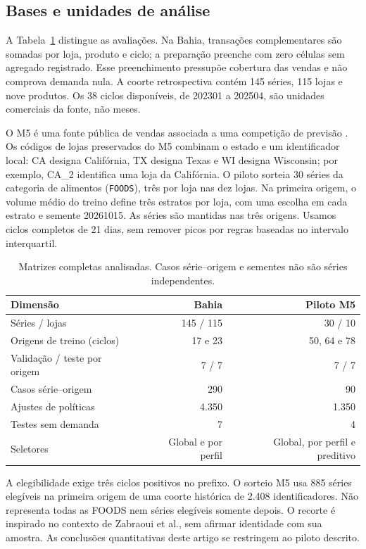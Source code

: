 \documentclass[preprint,12pt]{elsarticle}
\begin{document}
\subsection{Bases e unidades de análise}
A Tabela~\ref{tab:datasets} distingue as avaliações. Na Bahia, transações complementares são somadas por loja, produto e ciclo; a preparação preenche com zero células sem agregado registrado. Esse preenchimento pressupõe cobertura das vendas e não comprova demanda nula. A coorte retrospectiva contém 145 séries, 115 lojas e nove produtos. Os 38 ciclos disponíveis, de 202301 a 202504, são unidades comerciais da fonte, não meses.

O M5 é uma fonte pública de vendas associada a uma competição de previsão \cite{Makridakis2022M5Accuracy}. Os códigos de lojas preservados do M5 combinam o estado e um identificador local: CA designa Califórnia, TX designa Texas e WI designa Wisconsin; por exemplo, CA\_2 identifica uma loja da Califórnia. O piloto sorteia 30 séries da categoria de alimentos (\texttt{FOODS}), três por loja nas dez lojas. Na primeira origem, o volume médio do treino define três estratos por loja, com uma escolha em cada estrato e semente 20261015. As séries são mantidas nas três origens. Usamos ciclos completos de 21 dias, sem remover picos por regras baseadas no intervalo interquartil.

\begin{table}[htbp]\centering\small
\caption{Matrizes completas analisadas. Casos série--origem e sementes não são séries independentes.}\label{tab:datasets}
\begin{tabular}{@{}lrr@{}}\toprule
Dimensão & Bahia & Piloto M5\\\midrule
Séries / lojas & 145 / 115 & 30 / 10\\
Origens de treino (ciclos) & 17 e 23 & 50, 64 e 78\\
Validação / teste por origem & 7 / 7 & 7 / 7\\
Casos série--origem & 290 & 90\\
Ajustes de políticas & 4.350 & 1.350\\
Testes sem demanda & 7 & 4\\
Seletores & Global e por perfil & Global, por perfil e preditivo\\\bottomrule
\end{tabular}\end{table}

A elegibilidade exige três ciclos positivos no prefixo. O sorteio M5 usa 885 séries elegíveis na primeira origem de uma coorte histórica de 2.408 identificadores. Não representa todas as FOODS nem séries elegíveis somente depois. O recorte é inspirado no contexto de Zabraoui et al., sem afirmar identidade com sua amostra. As conclusões quantitativas deste artigo se restringem ao piloto descrito.
\end{document}
